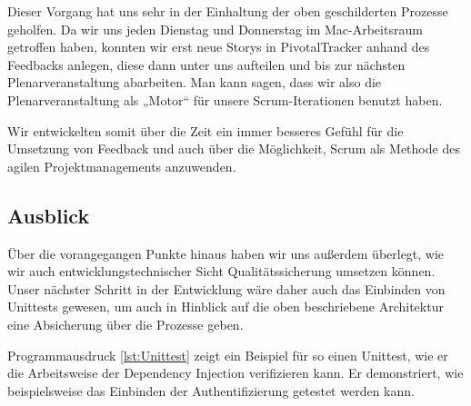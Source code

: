 	Dieser Vorgang hat uns sehr in der Einhaltung der oben geschilderten Prozesse geholfen. Da wir uns jeden Dienstag und Donnerstag im Mac-Arbeitsraum getroffen haben, konnten wir erst neue Storys in PivotalTracker anhand des Feedbacks anlegen, diese dann unter uns aufteilen und bis zur nächsten Plenarveranstaltung abarbeiten. Man kann sagen, dass wir also die Plenarveranstaltung als „Motor“ für unsere Scrum-Iterationen benutzt haben.
	
	Wir entwickelten somit über die Zeit ein immer besseres Gefühl für die Umsetzung von Feedback und auch über die Möglichkeit, Scrum als Methode des agilen Projektmanagements anzuwenden.

\subsection{Ausblick}
	Über die vorangegangen Punkte hinaus haben wir uns außerdem überlegt, wie wir auch entwicklungstechnischer Sicht Qualitätssicherung umsetzen können. Unser nächster Schritt in der Entwicklung wäre daher auch das Einbinden von Unittests gewesen, um auch in Hinblick auf die oben beschriebene Architektur eine Absicherung über die Prozesse geben.
	
	Programmausdruck \ref{lst:Unittest} zeigt ein Beispiel für so einen Unittest, wie er die Arbeitsweise der Dependency Injection verifizieren kann. Er demonstriert, wie beispielsweise das Einbinden der Authentifizierung getestet werden kann.
	
	